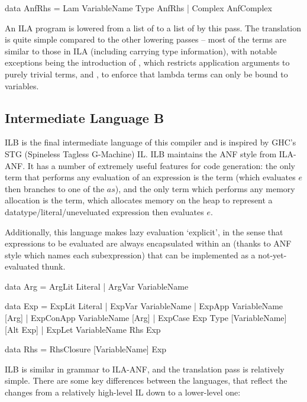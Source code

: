 \documentclass[dissertation.tex]{subfiles}
\begin{document}
{{\begin{haskellfigure}
        data AnfRhs = Lam VariableName Type AnfRhs
                    | Complex AnfComplex
        \end{haskellfigure}

        An ILA program is lowered from a list of  to a list of  by this pass. The translation is quite simple compared to the other lowering passes -- most of the terms are similar to those in ILA (including carrying type information), with notable exceptions being the introduction of , which restricts application arguments to purely trivial terms, and , to enforce that lambda terms can only be bound to variables.

    }
    \subsection{Intermediate Language B}
    {
        ILB is the final intermediate language of this compiler and is inspired by GHC's STG (Spineless Tagless G-Machine) IL. ILB maintains the ANF style from ILA-ANF. It has a number of extremely useful features for code generation: the only term that performs any evaluation of an expression is the  term (which evaluates \(e\) then branches to one of the \(as\)), and the only term which performs any memory allocation is the  term, which allocates memory on the heap to represent a datatype/literal/uneveluated expression then evaluates \(e\).

        Additionally, this language makes lazy evaluation `explicit', in the sense that expressions to be evaluated are always encapsulated within an  (thanks to ANF style which names each subexpression) that can be implemented as a not-yet-evaluated thunk.

        \begin{haskellfigure}
        data Arg = ArgLit Literal
                 | ArgVar VariableName

        data Exp = ExpLit Literal
                 | ExpVar VariableName
                 | ExpApp VariableName [Arg]
                 | ExpConApp VariableName [Arg]
                 | ExpCase Exp Type [VariableName] [Alt Exp]
                 | ExpLet VariableName Rhs Exp

        data Rhs = RhsClosure [VariableName] Exp
        \end{haskellfigure}

        ILB is similar in grammar to ILA-ANF, and the translation pass is relatively simple. There are some key differences between the languages, that reflect the changes from a relatively high-level IL down to a lower-level one:

}}
\end{document}
